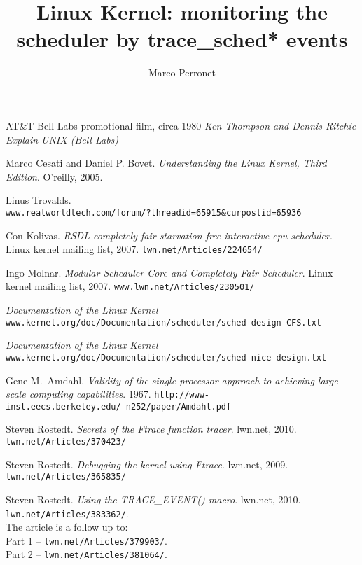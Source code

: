 \documentclass[10pt, oneside]{book}
\author{Marco Perronet}
\title{Linux Kernel: monitoring the scheduler by trace\_sched* events}
\date{}
\begin{document}
\frontmatter

\begin{titlepage}
\maketitle  
\end{titlepage}

\tableofcontents
\listoffigures



\mainmatter







\begin{thebibliography}{}
AT\&T Bell Labs promotional film, circa 1980
\textit{Ken Thompson and Dennis Ritchie Explain UNIX (Bell Labs)} %

Marco Cesati and Daniel P. Bovet.
\textit{Understanding the Linux Kernel, Third Edition}.
O'reilly, 2005.

Linus Trovalds.\\
\texttt{www.realworldtech.com/forum/?threadid=65915\&curpostid=65936}

Con Kolivas.
\textit{RSDL completely fair starvation free interactive cpu scheduler}.
Linux kernel mailing list, 2007. 
\texttt{lwn.net/Articles/224654/}

Ingo Molnar.
\textit{Modular Scheduler Core and Completely Fair Scheduler}.
Linux kernel mailing list, 2007. 
\texttt{www.lwn.net/Articles/230501/}

\textit{Documentation of the Linux Kernel}\\
\texttt{www.kernel.org/doc/Documentation/scheduler/sched-design-CFS.txt}

\textit{Documentation of the Linux Kernel}\\
\texttt{www.kernel.org/doc/Documentation/scheduler/sched-nice-design.txt}

Gene M.\ Amdahl.
\textit{Validity of the single processor approach to achieving large scale
computing capabilities}.
1967.
\texttt{http://www-inst.eecs.berkeley.edu/~n252/paper/Amdahl.pdf}

Steven Rostedt.
\textit{Secrets of the Ftrace function tracer}.
lwn.net, 2010.
\texttt{lwn.net/Articles/370423/}

Steven Rostedt.
\textit{Debugging the kernel using Ftrace}.
lwn.net, 2009.
\texttt{lwn.net/Articles/365835/}

Steven Rostedt.
\textit{Using the TRACE\_EVENT() macro}.
lwn.net, 2010.
\texttt{lwn.net/Articles/383362/}.\\
The article is a follow up to:\\
Part 1 -- \texttt{lwn.net/Articles/379903/}.\\
Part 2 -- \texttt{lwn.net/Articles/381064/}.
\end{thebibliography}
\end{document}

